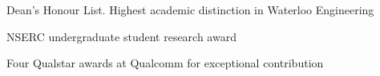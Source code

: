 
\cvsubsection{ }

\begin{cvitems}
    \item {Dean's Honour List. Highest academic distinction in Waterloo Engineering}
    \item {NSERC undergraduate student research award}
    \item {Four Qualstar awards at Qualcomm for exceptional contribution}
\end{cvitems}

\cvsubsection{ }